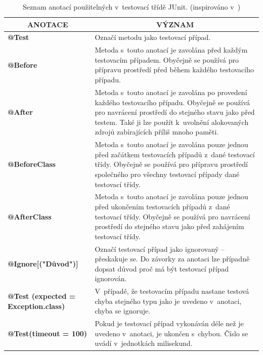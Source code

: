     \begin{table}
      \renewcommand{\tabularxcolumn}[1]{>{\small}m{#1}}
      \centering
      \begin{tabularx}{\textwidth}{|l|X|}
	\hline
	\multicolumn{1}{|c|}{\textbf{ANOTACE}} & \multicolumn{1}{c|}{\textbf{VÝZNAM}}\\ \hline
	\textbf{@Test} & Označí metodu jako testovací případ.\\ \hline
	\textbf{@Before} & Metoda s~touto anotací je zavolána před každým testovacím případem. Obyčejně se používá pro přípravu prostředí před během každého testovacího případu.\\ \hline
	\textbf{@After} & Metoda s~touto anotací je zavolána po provedení každého testovacího případu. Obyčejně se používá pro navrácení prostředí do stejného stavu jako před testem. Také ji lze použít k~uvolnění alokovaných zdrojů zabírajících příliš mnoho paměti.\\ \hline
	\textbf{@BeforeClass} & Metoda s~touto anotací je zavolána pouze jednou před začátkem testovacích případů z~dané testovací třídy.  Obyčejně se používá pro přípravu prostředí společného pro všechny testovací případy dané testovací třídy.\\ \hline
	\textbf{@AfterClass} & Metoda s~touto anotací je zavolána pouze jednou před ukončením testovacích případů z~dané testovací třídy. Obyčejně se používá pro navrácení prostředí do stejného stavu jako před zahájením testovací třídy.\\ \hline
	\textbf{@Ignore[("Důvod")]} & Označí testovací případ jako ignorovaný -- přeskakuje se. Do závorky za anotaci lze případně dopsat důvod proč má být testovací případ ignorován.\\ \hline
	\textbf{@Test (expected = Exception.class)} & V~případě, že testovacím případu nastane testová chyba stejného typu jako je uvedeno v~anotaci, chyba se ignoruje.\\ \hline
	\textbf{@Test(timeout = 100)} & Pokud je testovací případ vykonáván déle než je uvedeno v~anotaci, je ukončen s~chybou. Číslo se uvádí v~jednotkách milisekund.\\
	\hline
      \end{tabularx}
      \label{tab:junit_annotations}
      \caption{Seznam anotací použitelných v~testovací třídě JUnit. (inspirováno v~\cite{vogella:JUnit})}
    \end{table}


